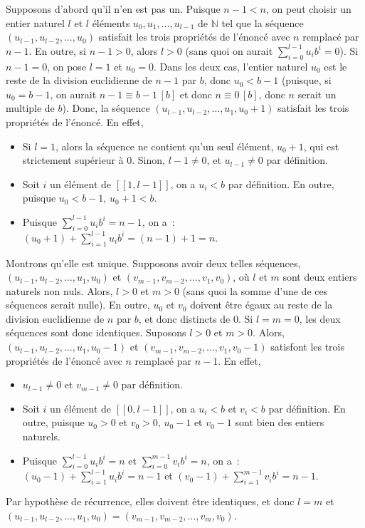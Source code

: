 Supposons d'abord qu'il n'en est pas un. 
Puisque $n-1 < n$, on peut choisir un entier naturel $l$ et $l$ éléments $u_0, u_1, \dots, u_{l-1}$ de $\mathbb{N}$ tel que la séquence $(u_{l-1}, u_{l-2}, \dots, u_0)$ satisfait les trois propriétés de l'énoncé avec $n$ remplacé par $n-1$. 
En outre, si $n-1 > 0$, alors $l > 0$ (sans quoi on aurait $\sum_{i=0}^{l-1} u_i b^{i} = 0$).
Si $n-1 = 0$, on pose $l = 1$ et $u_0 = 0$.
Dans les deux cas, l'entier naturel $u_0$ est le reste de la division euclidienne de $n-1$ par $b$, donc $u_0 < b-1$ (puisque, si $u_0 = b-1$, on aurait $n-1 \equiv b-1 \, [b]$ et donc $n \equiv 0 \, [b]$, donc $n$ serait un multiple de $b$). 
Donc, la séquence $(u_{l-1}, u_{l-2}, \dots, u_1, u_0+1)$ satisfait les trois propriétés de l'énoncé. 
En effet, 
\begin{itemize}[nosep]
    \item Si $l = 1$, alors la séquence ne contient qu'un seul élément, $u_0 + 1$, qui est strictement supérieur à $0$.
        Sinon, $l-1 \neq 0$, et $u_{l-1} \neq 0$ par définition.
    \item Soit $i$ un élément de $[\![1, l-1]\!]$, on a $u_i < b$ par définition. 
        En outre, puisque $u_0 < b-1$, $u_0+1 < b$.
    \item Puisque $\sum_{i=0}^{l-1} u_i b^i = n-1$, on a : $(u_0 + 1) + \sum_{i=1}^{l-1} u_i b^i = (n-1) + 1 = n$. 
\end{itemize}

Montrons qu'elle est unique. 
Supposons avoir deux telles séquences, $(u_{l-1}, u_{l-2}, \dots, u_1, u_0)$ et $(v_{m-1}, v_{m-2}, \dots, v_1, v_0)$, où $l$ et $m$ sont deux entiers naturels non nuls. 
Alors, $l > 0$ et $m > 0$ (sans quoi la somme d'une de ces séquences serait nulle).
En outre, $u_0$ et $v_0$ doivent être égaux au reste de la division euclidienne de $n$ par $b$, et donc distincts de $0$. 
Si $l = m = 0$, les deux séquences sont donc identiques. 
Suposons $l > 0$ et $m > 0$.
Alors, $(u_{l-1}, u_{l-2}, \dots, u_1, u_0-1)$ et $(v_{m-1}, v_{m-2}, \dots, v_1, v_0-1)$ satisfont les trois propriétés de l'énoncé avec $n$ remplacé par $n-1$.
En effet, 
\begin{itemize}[nosep]
    \item $u_{l-1} \neq 0$ et $v_{m-1} \neq 0$ par définition.
    \item Soit $i$ un élément de $[\![0, l-1]\!]$, on a $u_i < b$ et $v_i < b$ par définition. 
        En outre, puisque $u_0 > 0$ et $ v_0 > 0$, $u_0-1$ et $v_0-1$ sont bien des entiers naturels.
    \item Puisque $\sum_{i=0}^{l-1} u_i b^i = n$ et $\sum_{i=0}^{m-1} v_i b^i = n$, on a : $(u_0 - 1) + \sum_{i=1}^{l-1} u_i b^i = n-1$ et $(v_0 - 1) + \sum_{i=1}^{m-1} v_i b^i = n-1$. 
\end{itemize}
Par hypothèse de récurrence, elles doivent être identiques, et donc $l = m$ et $(u_{l-1}, u_{l-2}, \dots, u_1, u_0) = (v_{m-1}, v_{m-2}, \dots, v_m, v_0)$. 

